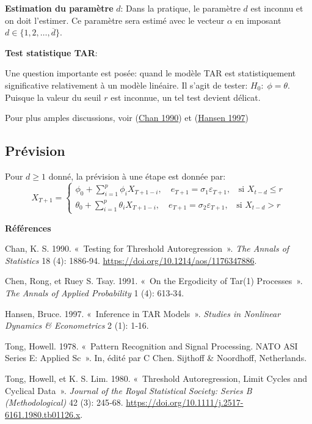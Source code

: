 \documentclass[
  french,
]{article}
\newlength{\cslhangindent}
\newlength{\cslentryspacingunit} %
\newenvironment{CSLReferences}[2] %
 {%
  \setlength{\parindent}{0pt}
  \ifodd #1
  \let\oldpar\par
  \def\par{\hangindent=\cslhangindent\oldpar}
  \fi
  \setlength{\parskip}{#2\cslentryspacingunit}
 }%
 {}
\begin{document}
\textbf{Estimation du paramètre} \(d\): Dans la pratique, le paramètre
\(d\) est inconnu et on doit l'estimer. Ce paramètre sera estimé avec le
vecteur \(\alpha\) en imposant \(d \in \{1,2,\ldots,\overline{d}\}\).

\textbf{Test statistique TAR}:

Une question importante est posée: quand le modèle TAR est
statistiquement significative relativement à un modèle linéaire. Il
s'agit de tester: \(H_0:\; \phi=\theta\). Puisque la valeur du seuil
\(r\) est inconnue, un tel test devient délicat.

Pour plus amples discussions, voir (\protect\hyperlink{ref-chan90}{Chan
1990}) et (\protect\hyperlink{ref-hansen97}{Hansen 1997})

\hypertarget{pruxe9vision}{%
\subsection{Prévision}\label{pruxe9vision}}

Pour \(d \geq 1\) donné, la prévision à une étape est donnée par: \[
X_{T+1}=\begin{cases}
\phi_0+\displaystyle\sum_{i=1}^p\phi_iX_{T+1-i},\quad e_{T+1}=\sigma_1\varepsilon_{T+1},\;\;\text{ si } X_{t-d}\leq r\\
\theta_0+\displaystyle\sum_{i=1}^p\theta_iX_{T+1-i},\quad e_{T+1}=\sigma_2\varepsilon_{T+1},\;\;\text{ si } X_{t-d}> r
\end{cases}
\]

\textbf{Références}

\hypertarget{refs}{}
\begin{CSLReferences}{1}{0}
\leavevmode{}%
Chan, K. S. 1990. {«~{Testing for Threshold Autoregression}~»}.
\emph{The Annals of Statistics} 18 (4): 1886‑94.
\url{https://doi.org/10.1214/aos/1176347886}.

\leavevmode{}%
Chen, Rong, et Ruey S. Tsay. 1991. {«~On the Ergodicity of Tar(1)
Processes~»}. \emph{The Annals of Applied Probability} 1 (4): 613‑34.

\leavevmode{}%
Hansen, Bruce. 1997. {«~Inference in TAR Models~»}. \emph{Studies in
Nonlinear Dynamics \& Econometrics} 2 (1): 1‑16.

\leavevmode{}%
Tong, Howell. 1978. {«~Pattern Recognition and Signal Processing. NATO
ASI Series E: Applied Sc~»}. In, édité par C Chen. Sijthoff \&
Noordhoff, Netherlands.

\leavevmode{}%
Tong, Howell, et K. S. Lim. 1980. {«~Threshold Autoregression, Limit
Cycles and Cyclical Data~»}. \emph{Journal of the Royal Statistical
Society: Series B (Methodological)} 42 (3): 245‑68.
\url{https://doi.org/10.1111/j.2517-6161.1980.tb01126.x}.

\end{CSLReferences}
\end{document}
